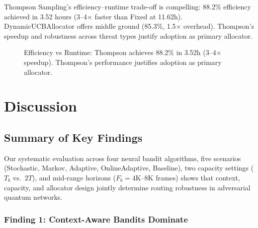 \documentclass[10pt,twocolumn,journal]{IEEEtran}
\begin{document}
Thompson Sampling's efficiency--runtime trade-off is compelling: 88.2\% efficiency achieved in 3.52 hours (3--4$\times$ faster than Fixed at 11.62h). DynamicUCBAllocator offers middle ground (85.3\%, 1.5$\times$ overhead). Thompson's speedup and robustness across threat types justify adoption as primary allocator.

\begin{figure}[t]
\centering
{}
\caption{Efficiency vs Runtime: Thompson achieves 88.2\% in 3.52h (3--4$\times$ speedup). Thompson's performance justifies adoption as primary allocator.}
\label{fig:runtime_tradeoff}
\end{figure}

\section{Discussion}
\label{sec:discussion}

\subsection{Summary of Key Findings}

Our systematic evaluation across four neural bandit algorithms, five scenarios (Stochastic, Markov, Adaptive, OnlineAdaptive, Baseline), two capacity settings ($T_b$ vs.\ $2T$), and mid-range horizons ($F_b = 4\text{K}–8\text{K}$ frames) shows that context, capacity, and allocator design jointly determine routing robustness in adversarial quantum networks.

\subsubsection{Finding 1: Context-Aware Bandits Dominate}
\end{document}
